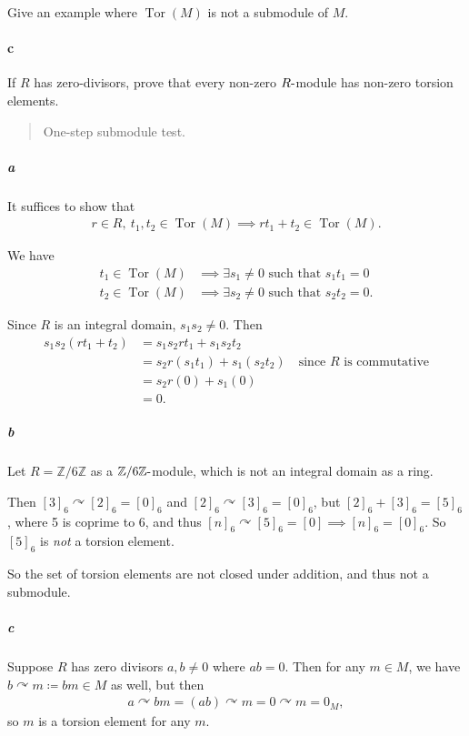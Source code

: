 Give an example where \(\operatorname{Tor}(M )\) is not a submodule of
\(M\).

\hypertarget{c-50}{%
\paragraph{c}\label{c-50}}

If \(R\) has zero-divisors, prove that every non-zero
\(R{\hbox{-}}\)module has non-zero torsion elements.

\begin{solution}

\begin{quote}
One-step submodule test.
\end{quote}

\hypertarget{a-89}{%
\subparagraph{a}\label{a-89}}

It suffices to show that
\begin{align*}
r\in R, ~t_1, t_2\in \operatorname{Tor}(M) \implies rt_1 + t_2 \in \operatorname{Tor}(M)
.\end{align*}

We have
\begin{align*}
t_1 \in \operatorname{Tor}(M) &\implies \exists s_1 \neq 0 \text{ such that } s_1 t_1  = 0 \\
t_2 \in \operatorname{Tor}(M) &\implies \exists s_2 \neq 0 \text{ such that } s_2 t_2  = 0 
.\end{align*}

Since \(R\) is an integral domain, \(s_1 s_2 \neq 0\). Then
\begin{align*}
s_1 s_2(rt_1 + t_2) 
&= s_1 s_2 r t_1 + s_1 s_2t_2 \\
&= s_2 r (s_1 t_1) + s_1 (s_2 t_2)  \quad\text{since $R$ is commutative} \\
&=  s_2 r(0) + s_1(0) \\
&= 0
.\end{align*}

\hypertarget{b-79}{%
\subparagraph{b}\label{b-79}}

Let \(R = {\mathbb{Z}}/6{\mathbb{Z}}\) as a
\({\mathbb{Z}}/6{\mathbb{Z}}{\hbox{-}}\)module, which is not an integral
domain as a ring.

Then \([3]_6\curvearrowright[2]_6 = [0]_6\) and
\([2]_6\curvearrowright[3]_6 = [0]_6\), but \([2]_6 + [3]_6 = [5]_6\),
where 5 is coprime to 6, and thus
\([n]_6\curvearrowright[5]_6 = [0] \implies [n]_6 = [0]_6\). So
\([5]_6\) is \emph{not} a torsion element.

So the set of torsion elements are not closed under addition, and thus
not a submodule.

\hypertarget{c-51}{%
\subparagraph{c}\label{c-51}}

Suppose \(R\) has zero divisors \(a,b \neq 0\) where \(ab = 0\). Then
for any \(m\in M\), we have \(b\curvearrowright m \coloneqq bm \in M\)
as well, but then
\begin{align*}
a\curvearrowright bm = (ab)\curvearrowright m = 0\curvearrowright m = 0_M
,\end{align*}
so \(m\) is a torsion element for any \(m\).

\end{solution}

